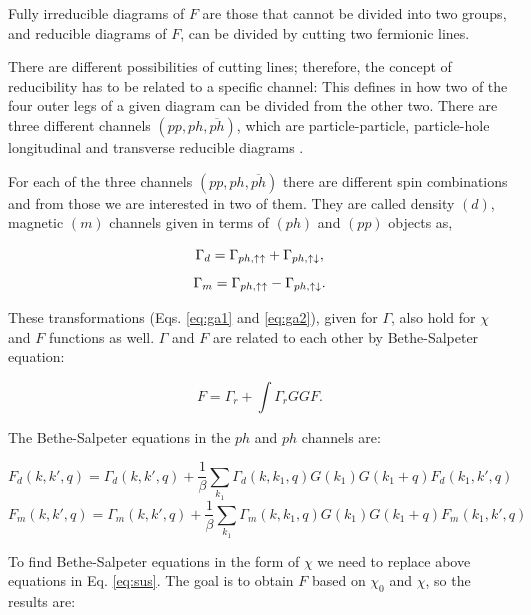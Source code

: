 Fully irreducible diagrams of $F$ are those that cannot be divided into two groups, and reducible diagrams of $F$, can be divided by cutting two fermionic lines. 

There are different possibilities of cutting lines; therefore, the concept of reducibility has to be related to a specific channel: This defines in how two of the four outer legs of a given diagram can be divided from the other two. There are three different channels $(pp, ph, \overline{ph})$, which are particle-particle, particle-hole
longitudinal and transverse reducible diagrams \cite{Valli}.


 For each of the three channels $(pp, ph, \overline{ph})$ there are different spin combinations  and from those we are interested in two of them. They are called density $(d)$, magnetic $(m)$ channels given in terms of $(ph)$ and $(pp)$ objects as,

\begin{equation}
    \Gamma _d= \Gamma _{ph,\uparrow \uparrow}+\Gamma _{ph,\uparrow \downarrow}\\,
    \label{eq:ga1}
\end{equation}
\begin{equation}
    \Gamma _m= \Gamma _{ph,\uparrow \uparrow}-\Gamma _{ph,\uparrow \downarrow}\\.
    \label{eq:ga2}
\end{equation}


These transformations (Eqs. \ref{eq:ga1} and \ref{eq:ga2}), given for $\Gamma$, also hold for $\chi$ and $F$ functions as well.  $\Gamma$ and $F$ are related to each other by Bethe-Salpeter equation:

\begin{equation}
    F=\Gamma _r +\int \Gamma _r GGF.
\end{equation}


The Bethe-Salpeter equations in the $ph$ and $ph$ channels are:

\begin{equation}
    F_{d}(k,k',q)= \Gamma _d (k,k',q)+ \frac{1}{\beta}\sum _{k_1}\Gamma _d (k,k_1,q)G(k_1)G(k_1+q) F_d(k_1,k',q)
\end{equation}
\begin{equation}
    F_{m}(k,k',q)= \Gamma _m (k,k',q)+ \frac{1}{\beta}\sum _{k_1}\Gamma _m (k,k_1,q)G(k_1)G(k_1+q) F_m(k_1,k',q)
\end{equation}


To find Bethe-Salpeter equations in the form of $\chi$ we need to replace above equations in Eq. \ref{eq:sus}. The goal is to obtain $F$ based on $\chi_0$ and $\chi$, so the results are:

